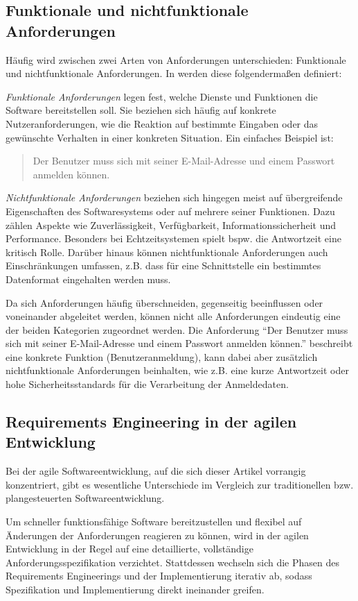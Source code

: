 \documentclass[acmtog]{acmart}
\begin{document}
\subsection{Funktionale und nichtfunktionale Anforderungen}
Häufig wird zwischen zwei Arten von Anforderungen unterschieden: Funktionale und nichtfunktionale Anforderungen. In \cite{sommerville16} werden diese folgendermaßen definiert:

\emph{Funktionale Anforderungen} legen fest, welche Dienste und Funktionen die Software bereitstellen soll. Sie beziehen sich häufig auf konkrete Nutzeranforderungen, wie die Reaktion auf bestimmte Eingaben oder das gewünschte Verhalten in einer konkreten Situation.
Ein einfaches Beispiel ist:
\begin{quote}
	Der Benutzer muss sich mit seiner E-Mail-Adresse und einem Passwort anmelden können.
\end{quote}

\emph{Nichtfunktionale Anforderungen} beziehen sich hingegen meist auf übergreifende Eigenschaften des Softwaresystems oder auf mehrere seiner Funktionen. Dazu zählen Aspekte wie Zuverlässigkeit, Verfügbarkeit, Informationssicherheit und Performance. Besonders bei Echtzeitsystemen spielt bspw. die Antwortzeit eine kritisch Rolle. Darüber hinaus können nichtfunktionale Anforderungen auch Einschränkungen umfassen, z.B. dass für eine Schnittstelle ein bestimmtes Datenformat eingehalten werden muss.

Da sich Anforderungen häufig überschneiden, gegenseitig beeinflussen oder voneinander abgeleitet werden, können nicht alle Anforderungen eindeutig eine der beiden Kategorien zugeordnet werden. Die Anforderung ``Der Benutzer muss sich mit seiner E-Mail-Adresse und einem Passwort anmelden können.'' beschreibt eine konkrete Funktion (Benutzeranmeldung), kann dabei aber zusätzlich nichtfunktionale Anforderungen beinhalten, wie z.B. eine kurze Antwortzeit oder hohe Sicherheitsstandards für die Verarbeitung der Anmeldedaten.

\subsection{Requirements Engineering in der agilen Entwicklung}
Bei der agile Softwareentwicklung, auf die sich dieser Artikel vorrangig konzentriert, gibt es wesentliche Unterschiede im Vergleich zur traditionellen bzw. plangesteuerten Softwareentwicklung.

Um schneller funktionsfähige Software bereitzustellen und flexibel auf Änderungen der Anforderungen reagieren zu können, wird in der agilen Entwicklung in der Regel auf eine detaillierte, vollständige  Anforderungsspezifikation verzichtet.
Stattdessen wechseln sich die Phasen des Requirements Engineerings und der Implementierung iterativ ab, sodass Spezifikation und Implementierung direkt ineinander greifen.
\end{document}
